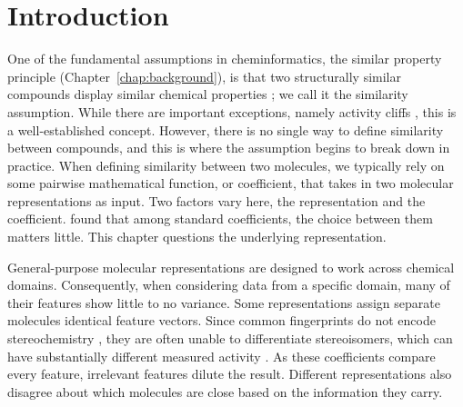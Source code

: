\section{Introduction}

One of the fundamental assumptions in cheminformatics, the similar property principle (Chapter~\ref{chap:background}), is that two structurally similar compounds display similar chemical properties \citep{Johnson1990}; we call it the similarity assumption. While there are important exceptions, namely activity cliffs \citep{Stumpfe2012, vanTilborg2022}, this is a well-established concept. However, there is no single way to define similarity between compounds, and this is where the assumption begins to break down in practice. When defining similarity between two molecules, we typically rely on some pairwise mathematical function, or coefficient, that takes in two molecular representations as input. Two factors vary here, the representation and the coefficient. \citet{Bajusz2015} found that among standard coefficients, the choice between them matters little. This chapter questions the underlying representation. 

General-purpose molecular representations are designed to work across chemical domains. Consequently, when considering data from a specific domain, many of their features show little to no variance. Some representations assign separate molecules identical feature vectors. Since common fingerprints do not encode stereochemistry \citep{orsi2024map4c}, they are often unable to differentiate stereoisomers, which can have substantially different measured activity \citep{Nguyen2006}. As these coefficients compare every feature, irrelevant features dilute the result. Different representations also disagree about which molecules are close based on the information they carry. 


